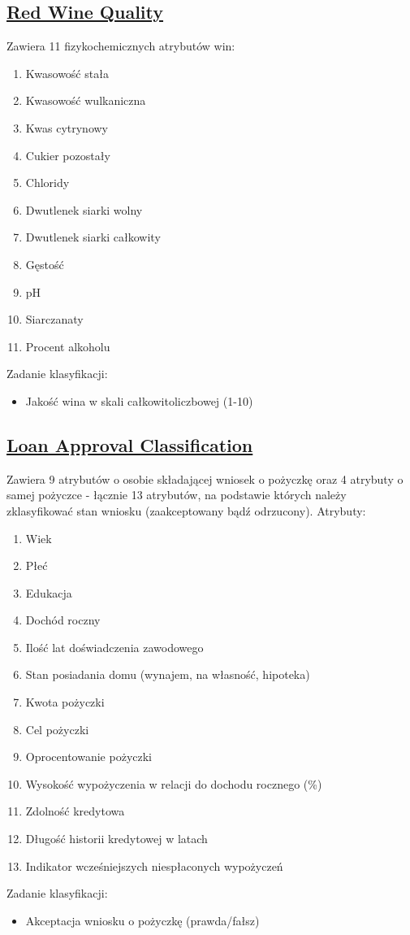 \documentclass[11pt]{article}
\begin{document}
\subsection{\href{https://www.kaggle.com/datasets/uciml/red-wine-quality-cortez-et-al-2009/data}{Red Wine Quality}}
\label{sec:orge712876}
Zawiera 11 fizykochemicznych atrybutów win:
\begin{enumerate}
\item Kwasowość stała
\item Kwasowość wulkaniczna
\item Kwas cytrynowy
\item Cukier pozostały
\item Chloridy
\item Dwutlenek siarki wolny
\item Dwutlenek siarki całkowity
\item Gęstość
\item pH
\item Siarczanaty
\item Procent alkoholu
\end{enumerate}
Zadanie klasyfikacji:
\begin{itemize}
\item Jakość wina w skali całkowitoliczbowej (1-10)
\end{itemize}
\subsection{\href{https://www.kaggle.com/datasets/taweilo/loan-approval-classification-data}{Loan Approval Classification}}
\label{sec:org43de68f}
Zawiera 9 atrybutów o osobie składającej wniosek o pożyczkę oraz 4 atrybuty o samej pożyczce - łącznie 13 atrybutów, na podstawie których należy zklasyfikować stan wniosku (zaakceptowany bądź odrzucony). Atrybuty:
\begin{enumerate}
\item Wiek
\item Płeć
\item Edukacja
\item Dochód roczny
\item Ilość lat doświadczenia zawodowego
\item Stan posiadania domu (wynajem, na własność, hipoteka)
\item Kwota pożyczki
\item Cel pożyczki
\item Oprocentowanie pożyczki
\item Wysokość wypożyczenia w relacji do dochodu rocznego (\%)
\item Zdolność kredytowa
\item Długość historii kredytowej w latach
\item Indikator wcześniejszych niespłaconych wypożyczeń
\end{enumerate}
Zadanie klasyfikacji:
\begin{itemize}
\item Akceptacja wniosku o pożyczkę (prawda/fałsz)
\end{itemize}
\end{document}
